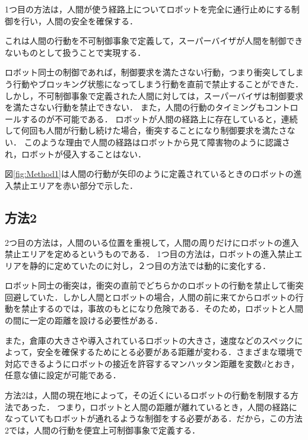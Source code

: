 1つ目の方法は，人間が使う経路上についてロボットを完全に通行止めにする制御を行い，人間の安全を確保する．

これは人間の行動を不可制御事象で定義して，スーパーバイザが人間を制御できないものとして扱うことで実現する．

ロボット同士の制御であれば，制御要求を満たさない行動，つまり衝突してしまう行動やブロッキング状態になってしまう行動を直前で禁止することができた．
しかし，不可制御事象で定義された人間に対しては，スーパーバイザは制御要求を満たさない行動を禁止できない．
また，人間の行動のタイミングもコントロールするのが不可能である．
ロボットが人間の経路上に存在していると，連続して何回も人間が行動し続けた場合，衝突することになり制御要求を満たさない．
このような理由で人間の経路はロボットから見て障害物のように認識され，ロボットが侵入することはない．


図\ref{fig:Method1}は人間の行動が矢印のように定義されているときのロボットの進入禁止エリアを赤い部分で示した．


\subsection{方法2}
2つ目の方法は，人間のいる位置を重視して，人間の周りだけにロボットの進入禁止エリアを定めるというものである． 1つ目の方法は，ロボットの進入禁止エリアを静的に定めていたのに対し，２つ目の方法では動的に変化する．

ロボット同士の衝突は，衝突の直前でどちらかのロボットの行動を禁止して衝突回避していた．しかし人間とロボットの場合，人間の前に来てからロボットの行動を禁止するのでは，事故のもとになり危険である．そのため，ロボットと人間の間に一定の距離を設ける必要性がある． 

また，倉庫の大きさや導入されているロボットの大きさ，速度などのスペックによって，安全を確保するためにとる必要がある距離が変わる．さまざまな環境で対応できるようにロボットの接近を許容するマンハッタン距離を変数$d$とおき，任意な値に設定が可能である．

方法2は，人間の現在地によって，その近くにいるロボットの行動を制限する方法であった．
つまり，ロボットと人間の距離が離れているとき，人間の経路になっていてもロボットが通れるような制御をする必要がある．だから，この方法2では，人間の行動を便宜上可制御事象で定義する．

